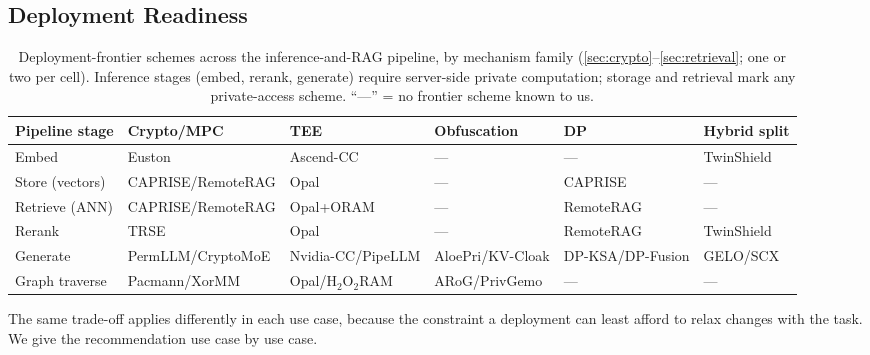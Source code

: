 \subsection{Deployment Readiness}
\label{ssec:deployment}

\begin{table}[b!]
  \centering \scriptsize
  \caption{Deployment-frontier schemes across the inference-and-RAG pipeline, by mechanism family
    (\cref{sec:crypto}--\cref{sec:retrieval}; one or two per cell). Inference stages (embed,
    rerank, generate) require server-side private computation; storage and retrieval mark any
    private-access scheme. ``---'' = no frontier scheme known to us.}
  \label{tab:gapmap}
  \begin{tabular*}{\textwidth}{@{\extracolsep{\fill}}llllll@{}}
    \toprule
    Pipeline stage & Crypto/MPC & TEE & Obfuscation & DP & Hybrid split \\
    \midrule
    Embed            & Euston       & Ascend-CC          & ---              & ---               & TwinShield \\
    Store (vectors)  & CAPRISE/RemoteRAG  & Opal               & ---              & CAPRISE               & --- \\
    Retrieve (ANN)   & CAPRISE/RemoteRAG  & Opal+ORAM          & ---              & RemoteRAG         & --- \\
    Rerank           & TRSE               & Opal                        & ---              & RemoteRAG         & TwinShield \\
    Generate         & PermLLM/CryptoMoE  & Nvidia-CC/PipeLLM            & AloePri/KV-Cloak & DP-KSA/DP-Fusion  & GELO/SCX \\
    Graph traverse   & Pacmann/XorMM      & Opal/H$_2$O$_2$RAM & ARoG/PrivGemo    & ---               & --- \\
    \bottomrule
  \end{tabular*}
\end{table}

The same trade-off applies differently in each use case, because the constraint a deployment can
least afford to relax changes with the task. We give the recommendation use case by use case.

